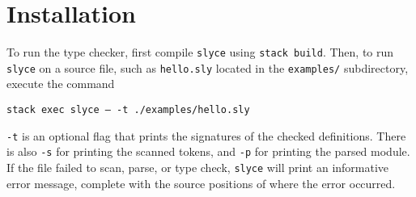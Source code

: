 \section{Installation}
 To run the type checker, first compile \texttt{slyce} using \texttt{stack build}. 
 Then, to run \texttt{slyce} on a source file, such as \texttt{hello.sly}
 located in the \texttt{examples/} subdirectory, execute the
 command\newline\centerline{\texttt{stack exec slyce -- -t ./examples/hello.sly}}\newline
\texttt{-t} is an optional flag that prints the signatures of the checked
definitions. There is also \texttt{-s} for printing the scanned tokens, and
\texttt{-p} for printing the parsed module.
 If the file failed to scan, parse, or type check, \texttt{slyce} 
will print an informative error message, complete with the source positions of
where the error occurred.
